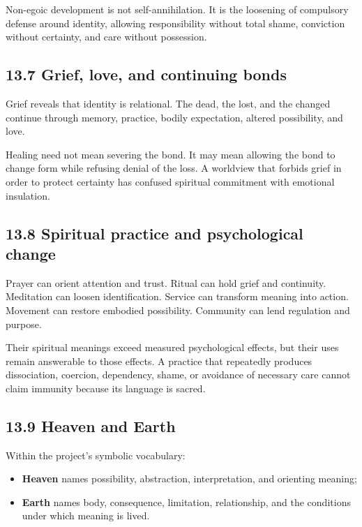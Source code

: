 \documentclass[
  11pt,
]{article}
\providecommand{\tightlist}{%
  \setlength{\itemsep}{0pt}\setlength{\parskip}{0pt}}
\begin{document}
Non-egoic development is not self-annihilation. It is the loosening of
compulsory defense around identity, allowing responsibility without
total shame, conviction without certainty, and care without possession.

\subsection{13.7 Grief, love, and continuing
bonds}\label{grief-love-and-continuing-bonds}

Grief reveals that identity is relational. The dead, the lost, and the
changed continue through memory, practice, bodily expectation, altered
possibility, and love.

Healing need not mean severing the bond. It may mean allowing the bond
to change form while refusing denial of the loss. A worldview that
forbids grief in order to protect certainty has confused spiritual
commitment with emotional insulation.

\subsection{13.8 Spiritual practice and psychological
change}\label{spiritual-practice-and-psychological-change}

Prayer can orient attention and trust. Ritual can hold grief and
continuity. Meditation can loosen identification. Service can transform
meaning into action. Movement can restore embodied possibility.
Community can lend regulation and purpose.

Their spiritual meanings exceed measured psychological effects, but
their uses remain answerable to those effects. A practice that
repeatedly produces dissociation, coercion, dependency, shame, or
avoidance of necessary care cannot claim immunity because its language
is sacred.

\subsection{13.9 Heaven and Earth}\label{heaven-and-earth}

Within the project's symbolic vocabulary:

\begin{itemize}
\tightlist
\item
  \textbf{Heaven} names possibility, abstraction, interpretation, and
  orienting meaning;
\item
  \textbf{Earth} names body, consequence, limitation, relationship, and
  the conditions under which meaning is lived.
\end{itemize}
\end{document}
